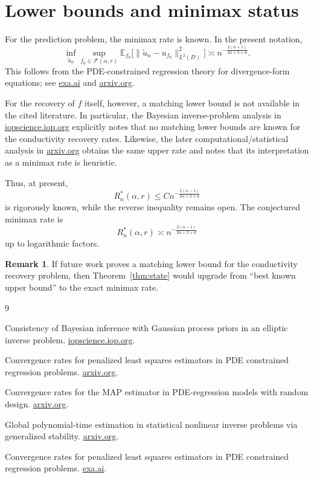 \documentclass[11pt]{article}
\theoremstyle{plain}
\theoremstyle{definition}
\newtheorem{remark}[theorem]{Remark}
\newcommand{\E}{\mathbb E}
\newcommand{\1}{\mathbf 1}
\newcommand{\F}{\mathcal F}
\begin{document}
\section{Lower bounds and minimax status}

For the prediction problem, the minimax rate is known. In the present notation,
\[
\inf_{\tilde u_n}
\sup_{f_0\in\F(\alpha,r)}
\E_{f_0}\bigl[\|\tilde u_n-u_{f_0}\|_{L^2(D)}^2\bigr]
\asymp
n^{-\frac{2(\alpha+1)}{2\alpha+2+d}}.
\]
This follows from the PDE-constrained regression theory for divergence-form equations; see
\href{https://exa.ai/library/publication/rj7jk1yjt53}{exa.ai}
and
\href{https://export.arxiv.org/pdf/1809.08818v3.pdf}{arxiv.org}.

For the recovery of \(f\) itself, however, a matching lower bound is not available in the cited literature. In particular, the Bayesian inverse-problem analysis in
\href{https://google.iopscience.iop.org/article/10.1088/1361-6420/ab7d2a}{iopscience.iop.org}
explicitly notes that no matching lower bounds are known for the conductivity recovery rates. Likewise, the later computational/statistical analysis in
\href{https://arxiv.org/html/2601.09007}{arxiv.org}
obtains the same upper rate and notes that its interpretation as a minimax rate is heuristic.

Thus, at present,
\[
R_n^*(\alpha,r)
\le
C n^{-\frac{2(\alpha-1)}{2\alpha+2+d}}
\]
is rigorously known, while the reverse inequality remains open. The conjectured minimax rate is
\[
R_n^*(\alpha,r)
\asymp
n^{-\frac{2(\alpha-1)}{2\alpha+2+d}}
\]
up to logarithmic factors.

\begin{remark}
If future work proves a matching lower bound for the conductivity recovery problem, then Theorem~\ref{thm:state} would upgrade from ``best known upper bound'' to the exact minimax rate.
\end{remark}

\begin{thebibliography}{9}

Consistency of Bayesian inference with Gaussian process priors in an elliptic inverse problem.
\href{https://google.iopscience.iop.org/article/10.1088/1361-6420/ab7d2a}{iopscience.iop.org}.

Convergence rates for penalized least squares estimators in PDE constrained regression problems.
\href{https://export.arxiv.org/pdf/1809.08818v3.pdf}{arxiv.org}.

Convergence rates for the MAP estimator in PDE-regression models with random design.
\href{https://arxiv.org/html/2409.03417}{arxiv.org}.

Global polynomial-time estimation in statistical nonlinear inverse problems via generalized stability.
\href{https://arxiv.org/html/2601.09007}{arxiv.org}.

Convergence rates for penalized least squares estimators in PDE constrained regression problems.
\href{https://exa.ai/library/publication/rj7jk1yjt53}{exa.ai}.

\end{thebibliography}
\end{document}
